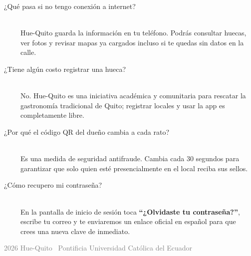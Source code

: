 \documentclass[11pt, a4paper, oneside]{article}
\begin{document}
\begin{description}
  \item[\ ¿Qué pasa si no tengo conexión a internet?] \hfill \\
  Hue-Quito guarda la información en tu teléfono. Podrás consultar huecas, ver fotos y revisar mapas ya cargados incluso si te quedas sin datos en la calle.

  \item[\ ¿Tiene algún costo registrar una hueca?] \hfill \\
  No. Hue-Quito es una iniciativa académica y comunitaria para rescatar la gastronomía tradicional de Quito; registrar locales y usar la app es completamente libre.

  \item[\ ¿Por qué el código QR del dueño cambia a cada rato?] \hfill \\
  Es una medida de seguridad antifraude. Cambia cada 30 segundos para garantizar que solo quien esté presencialmente en el local reciba sus sellos.

  \item[\ ¿Cómo recupero mi contraseña?] \hfill \\
  En la pantalla de inicio de sesión toca \textbf{``¿Olvidaste tu contraseña?''}, escribe tu correo y te enviaremos un enlace oficial en español para que crees una nueva clave de inmediato.
\end{description}

\vfill
\begin{center}
  \small\textcolor{gray}{\textcopyright\ 2026 Hue-Quito \textbar\ Pontificia Universidad Católica del Ecuador}
\end{center}
\end{document}
